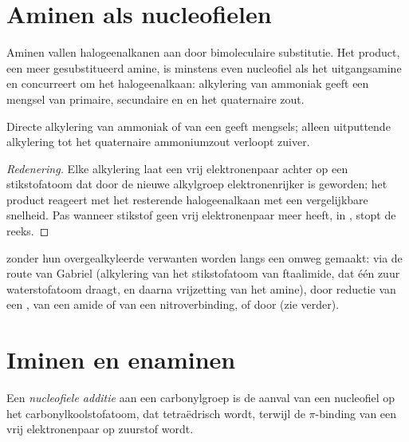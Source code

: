 \section{Aminen als nucleofielen}

Aminen vallen halogeenalkanen aan door bimoleculaire substitutie. Het product, een meer gesubstitueerd
amine, is minstens even nucleofiel als het uitgangsamine en concurreert om het halogeenalkaan:
alkylering van ammoniak geeft een mengsel van primaire, secundaire en  en het
quaternaire zout.

\begin{proposition}[Polyalkylering]\label{prop:b2:amines:polyalkylation}
Directe alkylering van ammoniak of van een  geeft mengsels; alleen uitputtende alkylering
tot het quaternaire ammoniumzout verloopt zuiver.
\end{proposition}

\begin{proof}[Redenering]
Elke alkylering laat een vrij elektronenpaar achter op een stikstofatoom dat door de nieuwe alkylgroep
elektronenrijker is geworden; het product reageert met het resterende halogeenalkaan met een vergelijkbare snelheid. Pas wanneer
stikstof geen vrij elektronenpaar meer heeft, in , stopt de reeks.
\end{proof}

 zonder hun overgealkyleerde verwanten worden langs een omweg gemaakt: via de route
van Gabriel (alkylering van het stikstofatoom van ftaalimide, dat één zuur waterstofatoom draagt, en daarna
vrijzetting van het amine), door reductie van een , van een amide of van een nitroverbinding, of door
 (zie verder).

\section{Iminen en enaminen}

\begin{definition}\label{def:b2:amines:nucleophilic-addition}
Een \emph{nucleofiele additie} aan een carbonylgroep is de aanval van
een nucleofiel op het carbonylkoolstofatoom, dat tetraëdrisch wordt, terwijl de $\pi$-binding van 
een vrij elektronenpaar op zuurstof wordt.
\end{definition}

